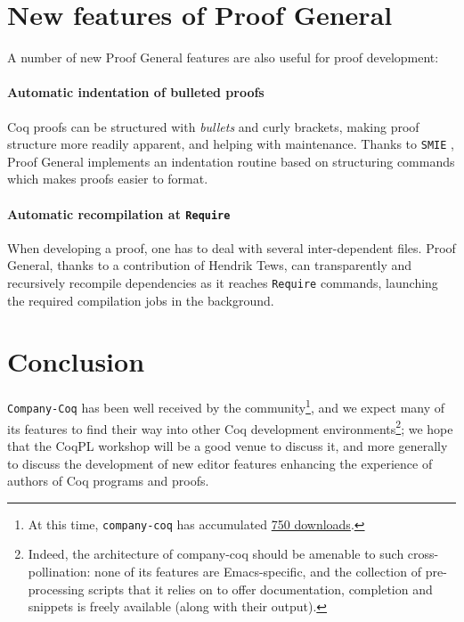 \documentclass[preprint]{sigplanconf}
\newcommand{\proofg}{Proof General\xspace}
\begin{document}
\section*{New features of \proofg}

A number of new \proofg features are also useful for proof development:

\paragraph{Automatic indentation of bulleted proofs} Coq proofs can be structured with \emph{bullets} and curly brackets, making proof structure more readily apparent, and helping with maintenance. Thanks to \texttt{SMIE} \cite{SMIE}, \proofg implements an indentation routine based on structuring commands which makes proofs easier to format.

\paragraph{Automatic recompilation at \texttt{Require}} When developing a proof, one has to deal with several inter-dependent files. \proofg, thanks to a contribution of Hendrik Tews, can transparently and recursively recompile dependencies as it reaches \texttt{Require} commands, launching the required compilation jobs in the background.


\section*{Conclusion}
\texttt{Company-Coq} has been well received by the community\footnote{At this time, \texttt{company-coq} has accumulated \href{http://melpa.org/\#/company-coq}{750 downloads}.}, and we expect many of its features to find their way into other Coq development environments\footnote{Indeed, the architecture of company-coq should be amenable to such cross-pollination: none of its features are Emacs-specific, and the collection of pre-processing scripts that it relies on to offer documentation, completion and snippets is freely available (along with their output).}; we hope that the CoqPL workshop will be a good venue to discuss it, and more generally to discuss the development of new editor features enhancing the experience of authors of Coq programs and proofs.



\end{document}
